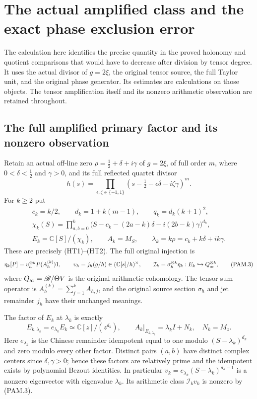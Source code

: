 \section{The actual amplified class and the exact phase exclusion error}
\label{sec:pam-phase}

The calculation here identifies the precise quantity in the proved
holonomy and quotient comparisons that would have to decrease after
division by tensor degree. It uses the actual divisor of \(g=2\xi\),
the original tensor source, the full Taylor unit, and the original
phase generator. Its estimates are calculations on those objects.
The tensor amplification itself and its nonzero arithmetic observation
are retained throughout.

\subsection{The full amplified primary factor and its nonzero observation}

Retain an actual off-line zero
\(\rho=\tfrac12+\delta+i\gamma\) of \(g=2\xi\), of full order \(m\),
where \(0<\delta<\tfrac12\) and \(\gamma>0\), and its full reflected
quartet divisor
\[
 h(s)=\prod_{\epsilon,\zeta\in\{-1,1\}}
     (s-\tfrac12-\epsilon\delta-i\zeta\gamma)^m .
 \tag{PAM.1}\label{eq:pam-packet}
\]
For \(k\ge2\) put
\[
 \begin{gathered}
 c_k=k/2,\qquad d_k=1+k(m-1),\qquad q_k=d_k(k+1)^2,\\
 \chi_k(S)=\prod_{a,b=0}^k
 \bigl(S-c_k-(2a-k)\delta-i(2b-k)\gamma\bigr)^{d_k},\\
 E_k=\mathbb C[S]/(\chi_k),\qquad A_k=M_S,\qquad
 \lambda_k=k\rho=c_k+k\delta+ik\gamma.
 \end{gathered}
 \tag{PAM.2}\label{eq:pam-grid}
\]
These are precisely (HT1)--(HT2). The full original injection is
\[
 \eta_k[P]=\upsilon_h^{\otimes k}P(A_h^{(k)})1,\qquad
 \upsilon_h=j_h(g/h)\in(\mathbb C[s]/h)^\times,\qquad
 \mathcal I_k=\sigma_h^{\otimes k}\eta_k:
      E_k\hookrightarrow Q_{\rm ar}^{\otimes k},
 \tag{PAM.3}\label{eq:pam-injection}
\]
where \(Q_{\rm ar}=\mathscr B/\Theta V\) is the original arithmetic
cohomology. The tensor-sum operator is
\(A_h^{(k)}=\sum_{j=1}^k A_{h,j}\), and the original source section
\(\sigma_h\) and jet remainder \(j_h\) have their unchanged meanings.

The factor of \(E_k\) at \(\lambda_k\) is exactly
\[
 E_{k,\lambda_k}
 =e_{\lambda_k}E_k\simeq\mathbb C[z]/(z^{d_k}),\qquad
 A_k|_{E_{k,\lambda_k}}=\lambda_k I+N_k,\quad N_k=M_z .
 \tag{PAM.4}\label{eq:pam-primary}
\]
Here \(e_{\lambda_k}\) is the Chinese remainder idempotent equal to
one modulo \((S-\lambda_k)^{d_k}\) and zero modulo every other
factor. Distinct pairs \((a,b)\) have distinct complex centers since
\(\delta,\gamma>0\); hence these factors are relatively prime and
the idempotent exists by polynomial Bezout identities. In particular
\(v_k=e_{\lambda_k}(S-\lambda_k)^{d_k-1}\) is a nonzero eigenvector
with eigenvalue \(\lambda_k\). Its arithmetic class
\(\mathcal I_kv_k\) is nonzero by (PAM.3).

